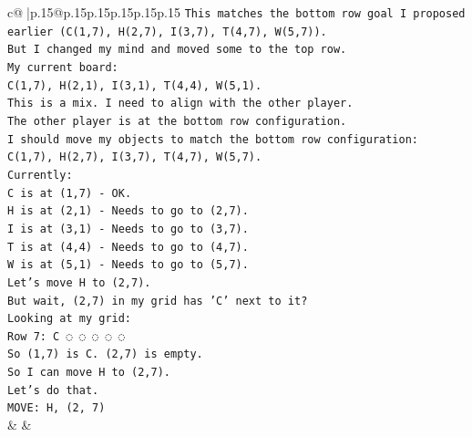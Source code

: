 \documentclass{article}
\begin{document}
{\begin{supertabular}{c@{$\;$}|p{.15\linewidth}@{}p{.15\linewidth}p{.15\linewidth}p{.15\linewidth}p{.15\linewidth}p{.15\linewidth}}
{{{\texttt{This matches the bottom row goal I proposed earlier (C(1,7), H(2,7), I(3,7), T(4,7), W(5,7)).} \\
\texttt{But I changed my mind and moved some to the top row.} \\
\texttt{My current board:} \\
\texttt{C(1,7), H(2,1), I(3,1), T(4,4), W(5,1).} \\
\texttt{This is a mix. I need to align with the other player.} \\
\texttt{The other player is at the bottom row configuration.} \\
\texttt{I should move my objects to match the bottom row configuration: C(1,7), H(2,7), I(3,7), T(4,7), W(5,7).} \\
\texttt{Currently:} \\
\texttt{C is at (1,7) {-} OK.} \\
\texttt{H is at (2,1) {-} Needs to go to (2,7).} \\
\texttt{I is at (3,1) {-} Needs to go to (3,7).} \\
\texttt{T is at (4,4) {-} Needs to go to (4,7).} \\
\texttt{W is at (5,1) {-} Needs to go to (5,7).} \\
\texttt{Let's move H to (2,7).} \\
\texttt{But wait, (2,7) in my grid has 'C' next to it?} \\
\texttt{Looking at my grid:} \\
\texttt{Row 7: C ◌ ◌ ◌ ◌ ◌} \\
\texttt{So (1,7) is C. (2,7) is empty.} \\
\texttt{So I can move H to (2,7).} \\
\texttt{Let's do that.} \\
\texttt{MOVE: H, (2, 7)} \\
            }
        }
    }
    & & \\ \\


\end{supertabular}}
\end{document}
